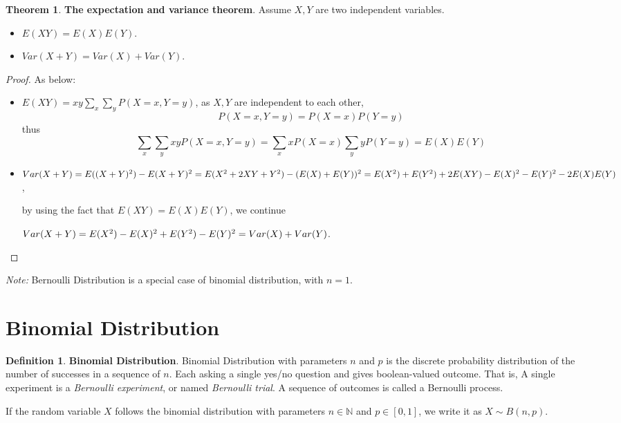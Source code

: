 \documentclass{article}
\theoremstyle{definition}
\newtheorem{defi}{Definition}[section]
\newtheorem{theorem}{Theorem}[section]
\begin{document}
\begin{theorem}
\textbf{The expectation and variance theorem}. Assume $X,Y$ are two independent variables.
    \begin{itemize}
        \item $E(XY)=E(X)E(Y)$.
        \item $Var(X+Y)=Var(X)+Var(Y)$.
    \end{itemize}
\begin{proof}
As below:
\begin{itemize}
    \item $E(XY)=xy\sum_{x}\sum_{y}P(X=x, Y=y)$, as $X,Y$ are independent to each other, $$P(X=x,Y=y)=P(X=x)P(Y=y)$$ thus $$\sum_{x}\sum_{y}xyP(X=x, Y=y)=\sum_{x}xP(X=x)\sum_{y}yP(Y=y)=E(X)E(Y)$$
    \item $Var(X+Y)\\=E((X+Y)^2)-E(X+Y)^2\\=E(X^2+2XY+Y^2)-(E(X)+E(Y))^2\\=E(X^2)+E(Y^2)+2E(XY)-E(X)^2-E(Y)^2-2E(X)E(Y)$, 
    
    by using the fact that $E(XY)=E(X)E(Y)$, we continue
    
    $Var(X+Y)\\=E(X^2)-E(X)^2+E(Y^2)-E(Y)^2\\=Var(X)+Var(Y)$.
\end{itemize}
\end{proof}
\end{theorem}

\textit{Note:} Bernoulli Distribution is a special case of binomial distribution, with $n=1$.

\section{Binomial Distribution}

\begin{defi}
\textbf{Binomial Distribution}. Binomial Distribution with parameters $n$ and $p$ is the discrete probability distribution of the number of successes in a sequence of $n$. Each asking a single yes/no question and gives boolean-valued outcome. That is, A single experiment is a \textit{Bernoulli experiment}, or named \textit{Bernoulli trial}. A sequence of outcomes is called a Bernoulli process. 

If the random variable $X$ follows the binomial distribution with parameters $n\in \mathbb{N}$ and $p\in[0,1]$, we write it as $X\sim B(n,p)$.
\end{defi}
\end{document}
